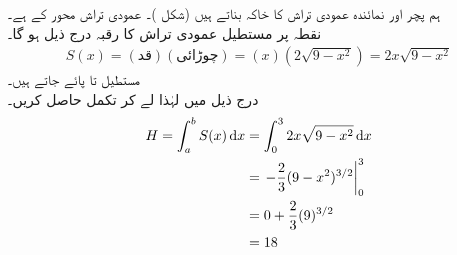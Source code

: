  \quad {}\quad
ہم پچر اور نمائندہ عمودی تراش کا خاکہ بناتے ہیں (شکل )۔ عمودی تراش محور  کے  ہے۔\\
\quad {}
\quad
نقطہ  پر مستطیل عمودی تراش کا رقبہ درج ذیل ہو گا۔
\begin{align*}
S(x)=(\text{قد})(\text{چوڑائی})=(x)(2\sqrt{9-x^2})=2x\sqrt{9-x^2}
\end{align*}
\quad
{}\quad
مستطیل  تا  پائے جاتے ہیں۔\\
\quad {}
درج ذیل میں  لہٰذا  لے کر تکمل حاصل کریں۔
\begin{align*}
H=\int_a^bS(x)\dif x&=\int_0^32x\sqrt{9-x^2}\dif x\\
&=\left.-\frac{2}{3}(9-x^2)^{3/2}\right\vert_0^3\\
&=0+\frac{2}{3}(9)^{3/2}\\
&=18
\end{align*}

